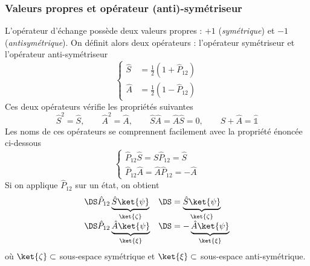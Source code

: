 \subsubsection{Valeurs propres et opérateur (anti)-symétriseur}
L'opérateur d'échange possède deux valeurs propres : $+1$ (\textit{symétrique}) et $-1$ (\textit{antisymétrique}). On 
définit alors deux opérateurs : l'opérateur symétriseur et l'opérateur anti-symétriseur
\begin{equation}
\left\{\begin{array}{ll}
\hat{S} &= \frac{1}{2}\left(1+\hat{P}_{12}\right)\\
\hat{A} &= \frac{1}{2}\left(1-\hat{P}_{12}\right)
\end{array}\right.
\end{equation}
Ces deux opérateurs vérifie les propriétés suivantes
\begin{equation}
\hat{S}^2 =\hat{S},\qquad \hat{A}^2=\hat{A},\qquad \hat{S}\hat{A}=\hat{A}\hat{S} = 0, \qquad \hat{S}+\hat{A}=\hat{\mathbb{1}}
\end{equation}
Les noms de ces opérateurs se comprennent facilement avec la propriété énoncée ci-dessous
\begin{equation}
\left\{\begin{array}{ll}
\hat{P}_{12}\hat{S} = \hat{S}\hat{P}_{12} = \hat{S}\\
\hat{P}_{12}\hat{A} = \hat{A}\hat{P}_{12} = -\hat{A}
\end{array}\right.
\end{equation}
Si on applique $\hat{P}_{12}$ sur un état, on obtient
\begin{equation}
\begin{array}{ll}
\DS\hat{P}_{12}\underbrace{\hat{S}\ket{\psi}}_{\ket{\zeta}}&\DS=\underbrace{\hat{S}\ket{\psi}}_{\ket{\zeta}}\\
\DS\hat{P}_{12}\underbrace{\hat{A}\ket{\psi}}_{\ket{\xi}}&\DS=-\underbrace{\hat{A}\ket{\psi}}_{\ket{\xi}}
\end{array}
\end{equation}
où $\ket{\zeta}\subset$ sous-espace symétrique et $\ket{\xi}\subset$ sous-espace anti-symétrique.






















